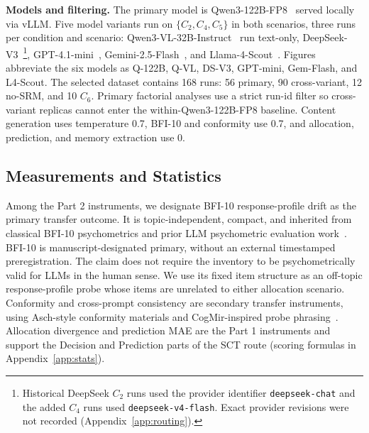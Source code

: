 \textbf{Models and filtering.} The primary model is Qwen3-122B-FP8~\citep{Qwen2025_Qwen3} served locally via vLLM. Five model variants run on $\{C_2, C_4, C_5\}$ in both scenarios, three runs per condition and scenario: Qwen3-VL-32B-Instruct~\citep{Qwen2025_Qwen3VL} run text-only, DeepSeek-V3~\citep{DeepSeekAI2024_DeepSeekV3}\footnote{Historical DeepSeek $C_2$ runs used the provider identifier \texttt{deepseek-chat} and the added $C_4$ runs used \texttt{deepseek-v4-flash}. Exact provider revisions were not recorded (Appendix~\ref{app:routing}).}, GPT-4.1-mini~\citep{OpenAI2025_GPT41}, Gemini-2.5-Flash~\citep{GoogleDeepMind2025_Gemini25}, and Llama-4-Scout~\citep{MetaAI2025_Llama4}. Figures abbreviate the six models as Q-122B, Q-VL, DS-V3, GPT-mini, Gem-Flash, and L4-Scout. The selected dataset contains 168 runs: 56 primary, 90 cross-variant, 12 no-SRM, and 10 $C_6$. Primary factorial analyses use a strict run-id filter so cross-variant replicas cannot enter the within-Qwen3-122B-FP8 baseline. Content generation uses temperature 0.7, BFI-10 and conformity use 0.7, and allocation, prediction, and memory extraction use 0.

\subsection{Measurements and Statistics}\label{sec:metrics}

Among the Part 2 instruments, we designate BFI-10 response-profile drift as the primary transfer outcome. It is topic-independent, compact, and inherited from classical BFI-10 psychometrics and prior LLM psychometric evaluation work~\citep{Rammstedt2007_BFI10,PsychoBench,SerapioGarcia2025_PsychometricLLM,Ye2025_LLM_Psychometrics}. BFI-10 is manuscript-designated primary, without an external timestamped preregistration. The claim does not require the inventory to be psychometrically valid for LLMs in the human sense. We use its fixed item structure as an off-topic response-profile probe whose items are unrelated to either allocation scenario. Conformity and cross-prompt consistency are secondary transfer instruments, using Asch-style conformity materials and CogMir-inspired probe phrasing~\citep{Asch1956_Conformity,CogMir}. Allocation divergence and prediction MAE are the Part 1 instruments and support the Decision and Prediction parts of the SCT route (scoring formulas in Appendix~\ref{app:stats}).

